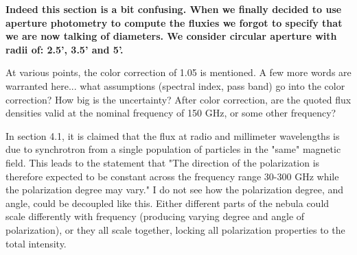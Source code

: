 \documentclass[12pt]{article}
\begin{document}
\begin{enumerate}
\textbf{Indeed this section is a bit confusing. When we finally decided to use aperture photometry to compute the fluxies we forgot to specify that we are now talking of diameters. We consider circular aperture with radii of: 2.5', 3.5' and 5'. }

At various points, the color correction of 1.05 is mentioned. A few 
more words are warranted here... what assumptions (spectral index, 
pass band) go into the color correction? How big is the uncertainty? 
After color correction, are the quoted flux densities valid at the 
nominal frequency of 150 GHz, or some other frequency? 

\textbf{}

In section 4.1, it is claimed that the flux at radio and millimeter 
wavelengths is due to synchrotron from a single population of 
particles in the "same" magnetic field. This leads to the statement 
that "The direction of the polarization is therefore expected to be 
constant across the frequency range 30-300 GHz while the polarization 
degree may vary." I do not see how the polarization degree, and 
angle, could be decoupled like this. Either different parts of the 
nebula could scale differently with frequency (producing varying 
degree and angle of polarization), or they all scale together, locking 
all polarization properties to the total intensity.
\textbf{}

\end{enumerate}
\end{document}

